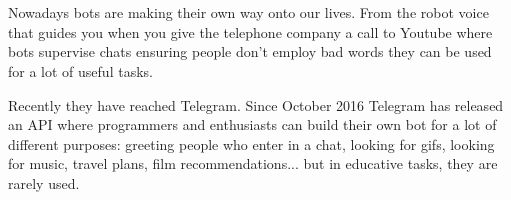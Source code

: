 \\

\vspace{0.7cm}
\\


Nowadays bots are making their own way onto our lives. From the robot voice that guides you when you give the telephone company a call  to Youtube where bots supervise chats ensuring people don't employ bad words they can be used for a lot of useful tasks.

\par

Recently they have reached Telegram. Since October 2016 Telegram has released an API where programmers and enthusiasts can build their own bot for a lot of different purposes: greeting people who enter in a chat, looking for gifs, looking for music, travel plans, film recommendations... but in educative tasks, they are rarely used.

\par

